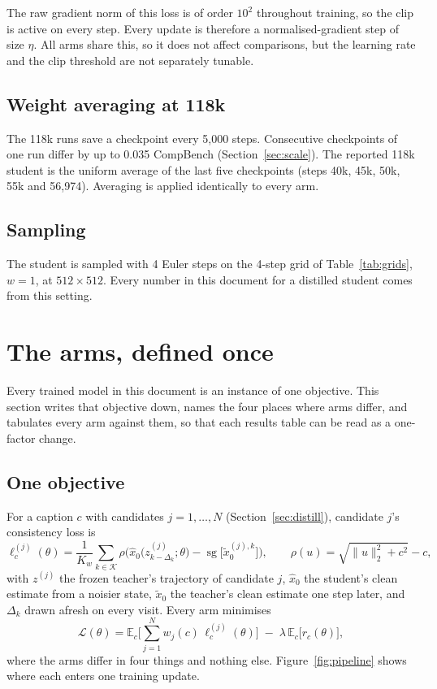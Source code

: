 \documentclass[11pt,a4paper]{article}
\DeclareMathOperator{\sg}{sg}
\begin{document}
The raw gradient norm of this loss is of order $10^2$ throughout training, so the clip is active on every step. Every update is therefore a normalised-gradient step of size $\eta$. All arms share this, so it does not affect comparisons, but the learning rate and the clip threshold are not separately tunable.

\subsection{Weight averaging at 118k}
The 118k runs save a checkpoint every 5,000 steps. Consecutive checkpoints of one run differ by up to 0.035 CompBench (Section~\ref{sec:scale}). The reported 118k student is the uniform average of the last five checkpoints (steps 40k, 45k, 50k, 55k and 56,974). Averaging is applied identically to every arm.

\subsection{Sampling}
The student is sampled with 4 Euler steps on the 4-step grid of Table~\ref{tab:grids}, $w=1$, at $512\times512$. Every number in this document for a distilled student comes from this setting.

\clearpage
\section{The arms, defined once}
\label{sec:arms}
Every trained model in this document is an instance of one objective. This section writes that objective down, names the four places where arms differ, and tabulates every arm against them, so that each results table can be read as a one-factor change.

\subsection{One objective}
For a caption $c$ with candidates $j=1,\dots,N$ (Section~\ref{sec:distill}), candidate $j$'s consistency loss is
\begin{equation}
\ell_c^{(j)}(\theta)=\frac{1}{K_w}\sum_{k\in\mathcal{K}}\rho\!\Big(\hat{x}_0\big(z^{(j)}_{k-\Delta_k};\theta\big)-\sg\big[\tilde{x}_0^{(j),k}\big]\Big),\qquad \rho(u)=\sqrt{\lVert u\rVert_2^2+c^2}-c,
\label{eq:cdloss}
\end{equation}
with $z^{(j)}$ the frozen teacher's trajectory of candidate $j$, $\hat{x}_0$ the student's clean estimate from a noisier state, $\tilde{x}_0$ the teacher's clean estimate one step later, and $\Delta_k$ drawn afresh on every visit. Every arm minimises
\begin{equation}
\mathcal{L}(\theta)=\mathbb{E}_c\Big[\sum_{j=1}^{N}w_j(c)\,\ell_c^{(j)}(\theta)\Big]\;-\;\lambda\,\mathbb{E}_c\big[r_c(\theta)\big],
\label{eq:unified}
\end{equation}
where the arms differ in four things and nothing else. Figure~\ref{fig:pipeline} shows where each enters one training update.
\end{document}
